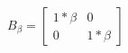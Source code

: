 \documentclass[preview]{standalone}
\begin{document}
\begin{align*}
B_{\beta} = \begin{bmatrix} 1* \beta & 0 \\ 0 & 1 *\beta\end{bmatrix}
\end{align*}
\end{document}
